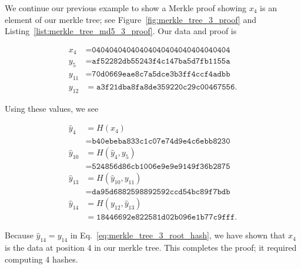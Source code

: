 \begin{example}

We continue our previous example to show a Merkle proof showing
$x_{4}$ is an element of our \gls{merkle tree};
see Figure~\ref{fig:merkle_tree_3_proof}
and Listing~\ref{list:merkle_tree_md5_3_proof}.
Our data and proof is



\begin{align}
    x_{4}  &= \texttt{04040404040404040404040404040404}
        \nonumber\\
    y_{5}  &= \texttt{af52282db55243f4c147ba5d7fb1155a}
        \nonumber\\
    y_{11} &= \texttt{70d0669eae8c7a5dce3b3ff4ccf4adbb}
        \nonumber\\
    y_{12} &= \texttt{a3f21dba8fa8de359220c29c00467556}.
\end{align}

\noindent
Using these values, we see

\begin{align}
    \hat{y}_{4}  &= H(x_{4}) \nonumber\\
        &= \texttt{b40ebeba833c1c07e74d9e4c6ebb8230}
            \nonumber\\
    \hat{y}_{10} &= H(\hat{y}_{4}, y_{5}) \nonumber\\
        &= \texttt{524856d86cb1006e9e9e9149f36b2875}
            \nonumber\\
    \hat{y}_{13} &= H(\hat{y}_{10}, y_{11}) \nonumber\\
        &= \texttt{da95d6882598892592ccd54bc89f7bdb
            }
            \nonumber\\
    \hat{y}_{14} &= H(y_{12}, \hat{y}_{13}) \nonumber\\
        &= \texttt{18446692e822581d02b096e1b77c9fff}.
\end{align}

\noindent
Because $\hat{y}_{14} = y_{14}$ in Eq.~\eqref{eq:merkle_tree_3_root_hash},
we have shown that $x_{4}$ is the data at position 4
in our \gls{merkle tree}.
This completes the proof;
it required computing 4 hashes.
\end{example}

